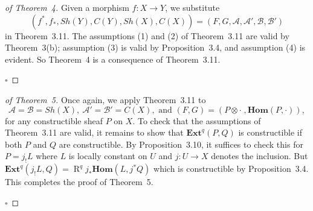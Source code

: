 \documentclass[10pt,twoside]{article}
\newcommand{\HHom}{{\mathbf{Hom}}}
\newcommand{\EExt}{{\mathbf{Ext}}}
\newcommand{\derived}{{\operatorname{R}}}
\newcommand{\qed}{\nopagebreak\par\hspace*{\fill}$\square$\par\vskip2mm}
\newtheorem{proof}{Proof}
\begin{document}
\begin{proof}[of Theorem~4] Given a morphism $f:X \to Y$,
we substitute 
$$
(f^*,f_*, Sh(Y), C(Y),Sh(X),C(X))= 
(F,G, \mathcal{A},  \mathcal{A'}, \mathcal{B}, \mathcal{B'})
$$ 
in Theorem~3.11. The assumptions (1) and (2) of Theorem~3.11 are  
valid by Theorem~3(b); assumption (3) is valid by Proposition~3.4, and 
assumption (4) is evident. So Theorem~4 is a consequence of Theorem~3.11. 
\qed\end{proof}

\begin{proof}[of Theorem~5] Once again, we apply
Theorem~3.11 to  
$$
\mathcal{A}=\mathcal{B}=Sh(X),\   \mathcal{A'}=\mathcal{B'}=C(X), 
\mbox{ and } (F,G)= (P \otimes \cdot\;, \HHom(P,\cdot)),
$$ 
for any constructible sheaf $P$ on $X$. To check that the assumptions
of Theorem~3.11 are valid, it remains to show that $\EExt^q(P,Q)$
 is constructible if both $P$ and $Q$ are constructible. By 
Proposition~3.10, it suffices to check this for $P=j_!L$ where $L$
 is locally constant on $U$ and $j:U \to X$ denotes the 
 inclusion.  But $\EExt^q(j_!L,Q)=\derived^q j_*\HHom (L,j^*Q)$
which is constructible by Proposition~3.4. This completes the
proof of Theorem~5.  
\qed\end{proof}
\end{document}
